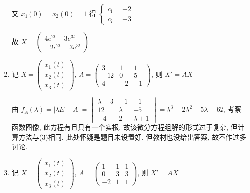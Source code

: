 \begin{enumerate}
                   又 \( x_{1}(0) = x_{2}(0) = 1 \) 得 \( \begin{cases}
                       c_{1} = -2 \\
                       c_{2} = -3
                   \end{cases} \)

                   故 \( X = \begin{pmatrix}
                       4e^{2t} - 3e^{3t} \\
                       -2e^{2t} + 3e^{3t}
                   \end{pmatrix} \)
             \item %
                   记 \( X = \begin{pmatrix}
                       x_{1}(t) \\
                       x_{2}(t) \\
                       x_{3}(t)
                   \end{pmatrix} \), \( A = \begin{pmatrix}
                       3   & 1  & 1  \\
                       -12 & 0  & 5  \\
                       4   & -2 & -1
                   \end{pmatrix} \), 则 \( X' = AX \)

                   由 \( f_{A}(\lambda) = |\lambda E - A| = \begin{vmatrix}
                       \lambda-3 & -1      & -1        \\
                       12        & \lambda & -5        \\
                       -4        & 2       & \lambda+1
                   \end{vmatrix} = \lambda^{3} - 2\lambda^{2} + 5\lambda - 62 \), 考察函数图像, 此方程有且只有一个实根. 故该微分方程组解的形式过于复杂, 但计算方法与(3)相同. 此处怀疑是题目未设置好. 但教材也没给出答案, 故不作过多讨论.
             \item %
                   记 \( X = \begin{pmatrix}
                       x_{1}(t) \\
                       x_{2}(t) \\
                       x_{3}(t)
                   \end{pmatrix} \), \( A = \begin{pmatrix}
                       1  & 1 & 1 \\
                       0  & 3 & 3 \\
                       -2 & 1 & 1
                   \end{pmatrix} \), 则 \( X' = AX \)


\end{enumerate}
